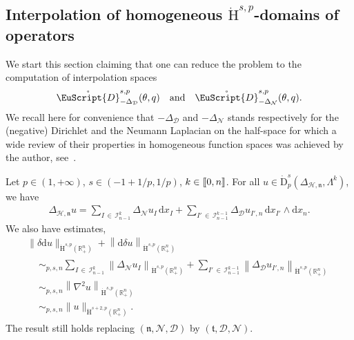 \documentclass[AHL,Unicode,longabstracts,published]{cedram}
\newcommand{\bbR}{\mathbb{R}}
\newcommand{\rmH}{\mathrm{H}}%
\newcommand{\rmd}{\mathrm{d}}
\newcommand{\rmD}{\mathrm{D}}
\newcommand{\clH}{\mathcal{H}}
\newcommand{\clI}{\mathcal{I}}
\newcommand{\clN}{\mathcal{N}}
\newcommand{\clD}{\mathcal{D}}
\newcommand{\fkn}{\mathfrak{n}}
\newcommand{\fkt}{\mathfrak{t}}
\newcommand{\rgeusD}{\mathring{\eus{D}}}
\newcommand{\eus}{\EuScript}
\newcommand{\llbracket}{\mathopen{[\mkern -2.7mu[}}
\newcommand{\rrbracket}{\mathclose{]\mkern -2.7mu]}}
\newcommand{\llb}{\llbracket}
\newcommand{\rrb}{\rrbracket}
\begin{document}
\subsection{Interpolation of homogeneous \texorpdfstring{$\dot{\rmH}^{s,p}$}{Hsp}-domains of operators}\label{sec:homogeneousinterp}


We start this section claiming that one can reduce the problem to the computation of interpolation spaces
\begin{align*}
\rgeusD^{s,p}_{-{\Delta}_{\clD}}(\theta,q) \quad\text{and}\quad \rgeusD^{s,p}_{-{\Delta}_{\clN}}(\theta,q).
\end{align*}
We recall here for convenience that $-{\Delta}_{\clD}$ and $-{\Delta}_{\clN}$ stands respectively for the (negative) Dirichlet and the Neumann Laplacian on the half-space for which a wide review of their properties in homogeneous function spaces was achieved by the author, see~\cite[Section~5]{Gaudin2022}.


\begin{lemm}\label{lem:Hs+2pestimateHodgeLap}
Let $p\in(1,+\infty)$, $s\in(-1+1/p,1/p)$, $k\in \llb 0,n\rrb$. For all $u \in\dot{\rmD}^{s}_{p}({{\Delta}}_{\clH,\fkn},\Lambda^k)$, we have
\begin{align*}
{{\Delta}}_{\clH,\fkn} u = \sum_{I\,\in\,\clI^{k}_{n-1}} \Delta_{\clN} u_{I}\,\rmd{x_I} + \sum_{I'\,\in\,\clI^{k-1}_{n-1}} \Delta_{\clD} u_{I',n}\,\rmd{x_{I'}}\wedge\rmd x_n .
\end{align*}
We also have estimates,
\begin{multline*}
\| \delta \rmd u \|_{\dot{\rmH}^{s,p}\left(\bbR^n_+\right)} + \left\| \rmd\delta u \right\|_{\dot{\rmH}^{s,p}\left(\bbR^n_+\right)}\\
\begin{aligned}
&\sim_{p,s,n} \sum_{I\,\in\,\clI^{k}_{n-1}} \left\| \Delta_{\clN} u_{I} \right\|_{\dot{\rmH}^{s,p}\left(\bbR^n_+\right)} + \sum_{I'\,\in\,\clI^{k-1}_{n-1}} \left\| \Delta_{\clD} u_{I',n} \right\|_{\dot{\rmH}^{s,p}\left(\bbR^n_+\right)}\\
& \sim_{p,s,n} \left\| \nabla^2 u \right\|_{\dot{\rmH}^{s,p}\left(\bbR^n_+\right)}\\
& \sim_{p,s,n} \| u \|_{\dot{\rmH}^{s+2,p}\left(\bbR^n_+\right)}.
\end{aligned}
\end{multline*}
The result still holds replacing $(\fkn,\clN,\clD)$ by $(\fkt,\clD,\clN)$.
\end{lemm}
\end{document}
